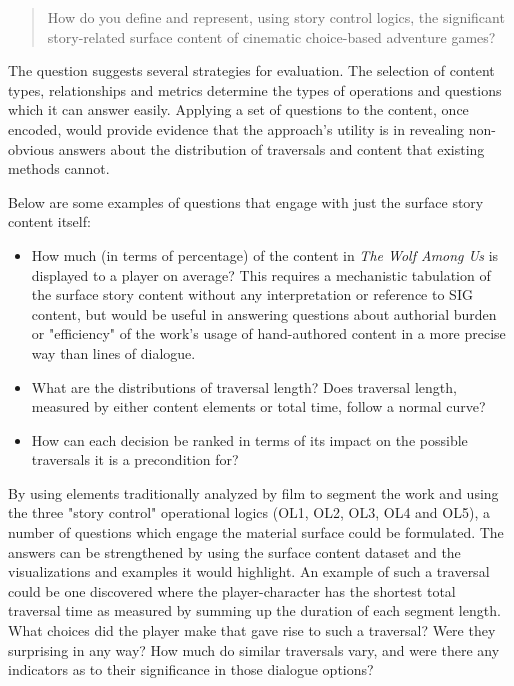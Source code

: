 \documentclass{llncs}
\begin{document}
\begin{quote}
How do you define and represent, using story control logics, the
significant story-related surface content of cinematic choice-based
adventure games?
\end{quote}

The question suggests several strategies for evaluation. The selection
of content types, relationships and metrics determine the types of
operations and questions which it can answer easily. Applying a set of
questions to the content, once encoded, would provide evidence that
the approach's utility is in revealing non-obvious answers about the
distribution of traversals and content that existing methods cannot.

Below are some examples of questions that engage with just the surface
story content itself:

\begin{itemize}
\item How much (in terms of percentage) of the content in \emph{The Wolf Among
Us} is displayed to a player on average? This requires a mechanistic
tabulation of the surface story content without any interpretation
or reference to SIG content, but would be useful in answering
questions about authorial burden or "efficiency" of the work's usage
of hand-authored content in a more precise way than lines of
dialogue.
\item What are the distributions of traversal length? Does traversal length,
measured by either content elements or total time, follow a normal
curve?
\item How can each decision be ranked in terms of its impact on the
possible traversals it is a precondition for?
\end{itemize}

By using elements traditionally analyzed by film to segment the work
and using the three "story control" operational logics (OL1, OL2, OL3,
OL4 and OL5), a number of questions which engage the material surface
could be formulated.  The answers can be strengthened by using the
surface content dataset and the visualizations and examples it would
highlight. An example of such a traversal could be one discovered
where the player-character has the shortest total traversal time as
measured by summing up the duration of each segment length. What
choices did the player make that gave rise to such a traversal? Were
they surprising in any way? How much do similar traversals vary, and
were there any indicators as to their significance in those dialogue
options?
\end{document}
